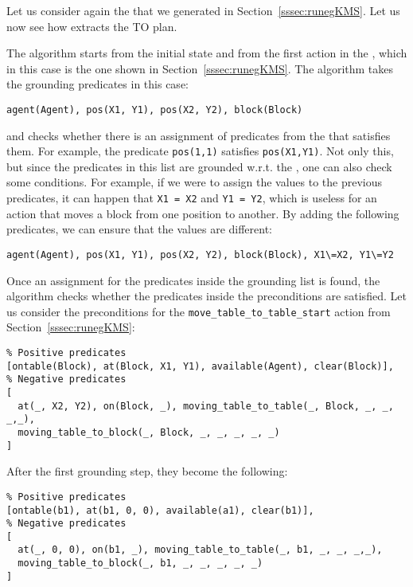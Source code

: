 Let us consider again the \kb that we generated in Section~\ref{sssec:runegKMS}. Let us now see how \frameworkname extracts the TO plan.

The algorithm starts from the initial state and from the first action in the \kb, which in this case is the one shown in Section~\ref{sssec:runegKMS}. The algorithm takes the grounding predicates in this case:

\begin{verbatim}
agent(Agent), pos(X1, Y1), pos(X2, Y2), block(Block)
\end{verbatim}

and checks whether there is an assignment of predicates from the \kbase that satisfies them. For example, the predicate \verb|pos(1,1)| satisfies \verb|pos(X1,Y1)|. Not only this, but since the predicates in this list are grounded w.r.t. the \kb, one can also check some conditions. For example, if we were to assign the values to the previous predicates, it can happen that \verb|X1 = X2| and \verb|Y1 = Y2|, which is useless for an action that moves a block from one position to another. By adding the following predicates, we can ensure that the values are different:

\begin{verbatim}
agent(Agent), pos(X1, Y1), pos(X2, Y2), block(Block), X1\=X2, Y1\=Y2
\end{verbatim}

Once an assignment for the predicates inside the grounding list is found, the algorithm checks whether the predicates inside the preconditions are satisfied. Let us consider the preconditions for the \verb|move_table_to_table_start| action from Section~\ref{sssec:runegKMS}:

\begin{verbatim}
% Positive predicates
[ontable(Block), at(Block, X1, Y1), available(Agent), clear(Block)],
% Negative predicates
[
  at(_, X2, Y2), on(Block, _), moving_table_to_table(_, Block, _, _, _,_), 
  moving_table_to_block(_, Block, _, _, _, _, _)
]
\end{verbatim}

After the first grounding step, they become the following:

\begin{verbatim}
% Positive predicates
[ontable(b1), at(b1, 0, 0), available(a1), clear(b1)],
% Negative predicates
[
  at(_, 0, 0), on(b1, _), moving_table_to_table(_, b1, _, _, _,_), 
  moving_table_to_block(_, b1, _, _, _, _, _)
]
\end{verbatim}

